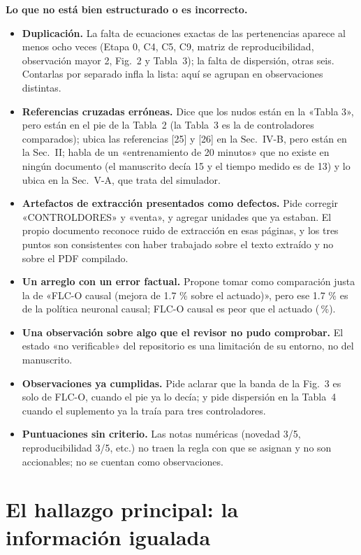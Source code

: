 \documentclass[10pt,a4paper]{article}
\newcommand{\FLC}{FLC-O}
\begin{document}
\textbf{Lo que no está bien estructurado o es incorrecto.}
\begin{itemize}
\item \textbf{Duplicación.} La falta de ecuaciones exactas de las pertenencias aparece al menos ocho veces (Etapa 0, C4, C5, C9, matriz de reproducibilidad, observación mayor 2, Fig.~2 y Tabla~3); la falta de dispersión, otras seis. Contarlas por separado infla la lista: aquí se agrupan en \RevN{} observaciones distintas.
\item \textbf{Referencias cruzadas erróneas.} Dice que los nudos están en la «Tabla 3», pero están en el pie de la Tabla~2 (la Tabla~3 es la de controladores comparados); ubica las referencias [25] y [26] en la Sec.~IV-B, pero están en la Sec.~II; habla de un «entrenamiento de 20 minutos» que no existe en ningún documento (el manuscrito decía 15 y el tiempo medido es de 13) y lo ubica en la Sec.~V-A, que trata del simulador.
\item \textbf{Artefactos de extracción presentados como defectos.} Pide corregir «CONTROLDORES» y «venta», y agregar unidades que ya estaban. El propio documento reconoce ruido de extracción en esas páginas, y los tres puntos son consistentes con haber trabajado sobre el texto extraído y no sobre el PDF compilado.
\item \textbf{Un arreglo con un error factual.} Propone tomar como comparación justa la de «FLC-O causal (mejora de 1.7 \% sobre el actuado)», pero ese 1.7 \% es de la política neuronal causal; FLC-O causal es peor que el actuado (\RedActFlcC\,\%).
\item \textbf{Una observación sobre algo que el revisor no pudo comprobar.} El estado «no verificable» del repositorio es una limitación de su entorno, no del manuscrito.
\item \textbf{Observaciones ya cumplidas.} Pide aclarar que la banda de la Fig.~3 es solo de \FLC{}, cuando el pie ya lo decía; y pide dispersión en la Tabla~4 cuando el suplemento ya la traía para tres controladores.
\item \textbf{Puntuaciones sin criterio.} Las notas numéricas (novedad 3/5, reproducibilidad 3/5, etc.) no traen la regla con que se asignan y no son accionables; no se cuentan como observaciones.
\end{itemize}

\section{El hallazgo principal: la información igualada}
\label{sec:hallazgo}
\end{document}

